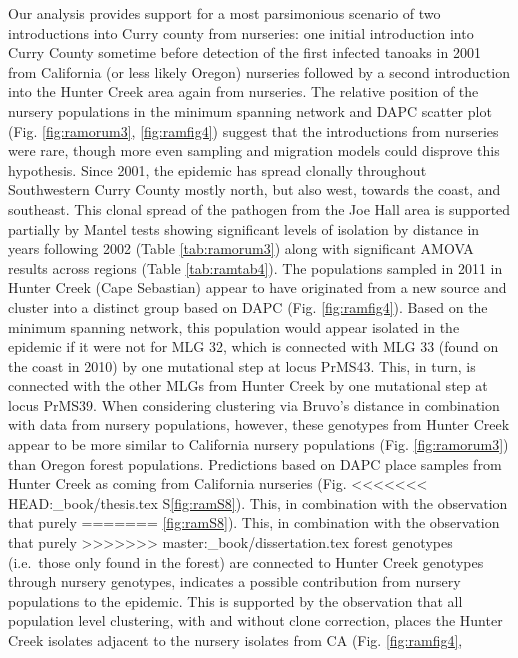 \documentclass[double,12pt]{beavtex}
\begin{document}
  Our analysis provides support for a most parsimonious scenario of two
  introductions into Curry county from nurseries: one initial introduction
  into Curry County sometime before detection of the first infected
  tanoaks in 2001 from California (or less likely Oregon) nurseries
  followed by a second introduction into the Hunter Creek area again from
  nurseries. The relative position of the nursery populations in the
  minimum spanning network and DAPC scatter plot (Fig. \ref{fig:ramorum3},
  \ref{fig:ramfig4}) suggest that the introductions from nurseries were
  rare, though more even sampling and migration models could disprove this
  hypothesis. Since 2001, the epidemic has spread clonally throughout
  Southwestern Curry County mostly north, but also west, towards the
  coast, and southeast. This clonal spread of the pathogen from the Joe
  Hall area is supported partially by Mantel tests showing significant
  levels of isolation by distance in years following 2002 (Table
  \ref{tab:ramorum3}) along with significant AMOVA results across regions
  (Table \ref{tab:ramtab4}). The populations sampled in 2011 in Hunter
  Creek (Cape Sebastian) appear to have originated from a new source and
  cluster into a distinct group based on DAPC (Fig. \ref{fig:ramfig4}).
  Based on the minimum spanning network, this population would appear
  isolated in the epidemic if it were not for MLG 32, which is connected
  with MLG 33 (found on the coast in 2010) by one mutational step at locus
  PrMS43. This, in turn, is connected with the other MLGs from Hunter
  Creek by one mutational step at locus PrMS39. When considering
  clustering via Bruvo's distance in combination with data from nursery
  populations, however, these genotypes from Hunter Creek appear to be
  more similar to California nursery populations (Fig. \ref{fig:ramorum3})
  than Oregon forest populations. Predictions based on DAPC place samples
  from Hunter Creek as coming from California nurseries (Fig.
<<<<<<< HEAD:_book/thesis.tex
  S\ref{fig:ramS8}). This, in combination with the observation that purely
=======
  \ref{fig:ramS8}). This, in combination with the observation that purely
>>>>>>> master:_book/dissertation.tex
  forest genotypes (i.e.~those only found in the forest) are connected to
  Hunter Creek genotypes through nursery genotypes, indicates a possible
  contribution from nursery populations to the epidemic. This is supported
  by the observation that all population level clustering, with and
  without clone correction, places the Hunter Creek isolates adjacent to
  the nursery isolates from CA (Fig. \ref{fig:ramfig4},
\end{document}
